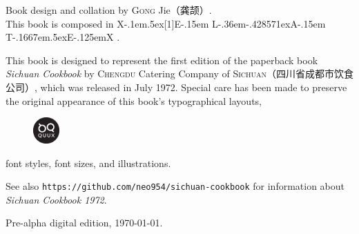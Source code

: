 Book design and collation by \textsc{Gong} Jie\!（龚颉）\!\!.\\
This book is composed in
\begingroup%
\rmfamily%
\footnotesize%
X\kern-.1em\lower.5ex\hbox{\scalebox{-1}[1]{E}}\kern-.15em%
L\kern-.36em\lower-.428571ex\hbox{\tiny{A}}\kern-.15em%
T\kern-.1667em\lower.5ex\hbox{E}\kern-.125emX%
\endgroup%
.

This book is designed to represent the first edition of the paperback book
\textit{Sichuan Cookbook}\!\! by \textsc{Chengdu}
Catering Company of \textsc{Sichuan}\!（四川省成都市饮食公司）\!\!, which was
released in July 1972. Special care has been made to preserve the original
appearance of this book's typographical layouts,
\begin{figure}%
\vspace{-1.25\baselineskip}%
\begin{flushright}%
\quad\includegraphics[height=10mm, width=10mm]{quux-logo.eps}%
\end{flushright}%
\vspace{-1.75\baselineskip}%
\end{figure}%
font styles, font sizes, and illustrations.

See also \texttt{https://github.com/neo954/sichuan-cookbook} for information
about \textit{Sichuan Cookbook 1972}\!\!.

Pre-alpha digital edition, \today.

\endgroup%


